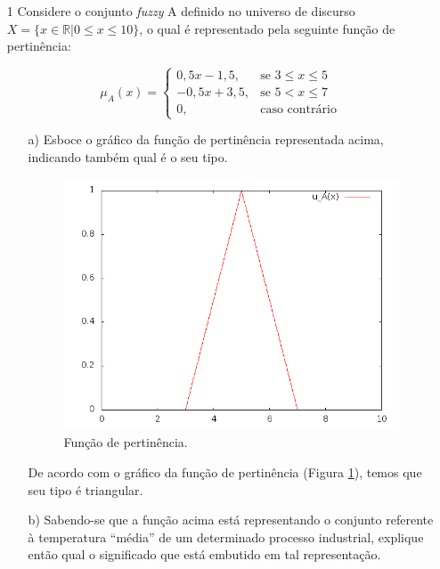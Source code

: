 \documentclass{report}
\begin{document}
\newpage

\begin{enumerate}

\item[1] Considere o conjunto \emph{fuzzy} A definido no universo de discurso $X = \{ x \in  \mathbb{R} \vert 0 \le x \le 10\}$,
o qual é representado pela seguinte função de pertinência:


\begin{equation*}
\mu_A (x) = 
\begin{cases} 
0,5x-1,5, & \text{se $3 \leq x \leq 5$}
\\
-0,5x+3,5, & \text{se $5 < x \leq 7$}
\\
0, &\text{caso contrário}
\end{cases}
\end{equation*}

\begin{enumerate}
    \item[a)] Esboce o gráfico da função de pertinência representada acima, indicando também qual é o seu tipo.

        \begin{figure}[hptb]
        \centering
        \includegraphics[scale=0.3]{ex1a.png}
        \caption{Função de pertinência.}
        \label{fig:1a}
        \end{figure}
    
    De acordo com o gráfico da função de pertinência (Figura \ref{fig:1a}), temos que seu tipo é triangular.
        

    \item[b)] Sabendo-se que a função acima está representando o conjunto referente à temperatura ``média'' de um determinado
    processo industrial, explique então qual o significado que está embutido em tal representação.


\end{enumerate}
\end{enumerate}
\end{document}
